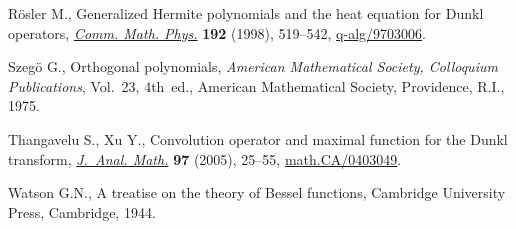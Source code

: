 \documentclass[pdftex]{sigma}
\numberwithin{equation}{section}
\numberwithin{theorem}{section}
\numberwithin{proposition}{section}
\numberwithin{lemma}{section}
\numberwithin{corollary}{section}
\numberwithin{definition}{section}
\numberwithin{example}{section}
\numberwithin{remark}{section}
\numberwithin{note}{section}
\theoremstyle{remark}
\begin{document}
\begin{thebibliography}{99}
R{\"o}sler M., Generalized {H}ermite polynomials and the heat equation for
{D}unkl operators, \href{http://dx.doi.org/10.1007/s002200050307}{\textit{Comm.
Math.
Phys.}} \textbf{192} (1998), 519--542,
\href{http://arxiv.org/abs/q-alg/9703006}{q-alg/9703006}.

Szeg{\"{o}} G., Orthogonal polynomials, \textit{American Mathematical Society,
Colloquium Publications}, Vol.~23, 4th~ed., American Mathematical Society,
Providence, R.I., 1975.

Thangavelu S., Xu Y., Convolution operator and maximal function for the {D}unkl
transform, \href{http://dx.doi.org/10.1007/BF02807401}{\textit{J.~Anal.
Math.}} \textbf{97} (2005), 25--55,
\href{http://arxiv.org/abs/math.CA/0403049}{math.CA/0403049}.

Watson G.N., A treatise on the theory of {B}essel functions, Cambridge
University Press, Cambridge, 1944.
\end{thebibliography}\LastPageEnding
\end{document}
